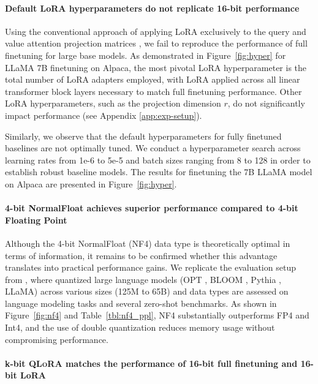 \paragraph{Default LoRA hyperparameters do not replicate 16-bit performance}

Using the conventional approach of applying LoRA exclusively to the query and value attention projection matrices \citep{hu2021lora}, we fail to reproduce the performance of full finetuning for large base models. As demonstrated in Figure~\ref{fig:hyper} for LLaMA 7B finetuning on Alpaca, the most pivotal LoRA hyperparameter is the total number of LoRA adapters employed, with LoRA applied across all linear transformer block layers necessary to match full finetuning performance. Other LoRA hyperparameters, such as the projection dimension $r$, do not significantly impact performance (see Appendix \ref{app:exp-setup}).

Similarly, we observe that the default hyperparameters for fully finetuned baselines are not optimally tuned. We conduct a hyperparameter search across learning rates from 1e-6 to 5e-5 and batch sizes ranging from 8 to 128 in order to establish robust baseline models. The results for finetuning the 7B LLaMA model on Alpaca are presented in Figure~\ref{fig:hyper}.

\paragraph{4-bit NormalFloat achieves superior performance compared to 4-bit Floating Point} 

Although the 4-bit NormalFloat (NF4) data type is theoretically optimal in terms of information, it remains to be confirmed whether this advantage translates into practical performance gains. We replicate the evaluation setup from \citet{dettmers2022case}, where quantized large language models (OPT \citep{zhang2022opt}, BLOOM \cite{scao2022bloom}, Pythia \cite{biderman2023pythia}, LLaMA) across various sizes (125M to 65B) and data types are assessed on language modeling tasks and several zero-shot benchmarks. As shown in Figure~\ref{fig:nf4} and Table~\ref{tbl:nf4_ppl}, NF4 substantially outperforms FP4 and Int4, and the use of double quantization reduces memory usage without compromising performance.

\paragraph{k-bit \textsc{QLoRA} matches the performance of 16-bit full finetuning and 16-bit LoRA} 

